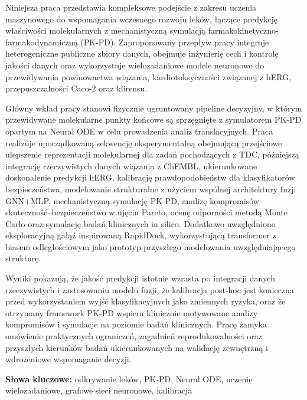 \documentclass[a4paper,11pt,twoside]{report}
\begin{document}
\begin{singlespace}
\fontsize{12pt}{14.4pt}\selectfont

Niniejsza praca przedstawia kompleksowe podejście z zakresu uczenia maszynowego do wspomagania wczesnego rozwoju leków, łączące predykcję właściwości molekularnych z mechanistyczną symulacją farmakokinetyczno-farmakodynamiczną (PK-PD). Zaproponowany przepływ pracy integruje heterogeniczne publiczne zbiory danych, obejmuje inżynierię cech i kontrolę jakości danych oraz wykorzystuje wielozadaniowe modele neuronowe do przewidywania powinowactwa wiązania, kardiotoksyczności związanej z hERG, przepuszczalności Caco-2 oraz klirensu.

Główny wkład pracy stanowi fizycznie ugruntowany pipeline decyzyjny, w którym przewidywane molekularne punkty końcowe są sprzęgnięte z symulatorem PK-PD opartym na Neural ODE w celu prowadzenia analiz translacyjnych. Praca realizuje uporządkowaną sekwencję eksperymentalną obejmującą przejściowe ulepszenie reprezentacji molekularnej dla zadań pochodzących z TDC, późniejszą integrację rzeczywistych danych wiązania z ChEMBL, ukierunkowane doskonalenie predykcji hERG, kalibrację prawdopodobieństw dla klasyfikatorów bezpieczeństwa, modelowanie strukturalne z użyciem wspólnej architektury fuzji GNN+MLP, mechanistyczną symulację PK-PD, analizę kompromisów skuteczność--bezpieczeństwo w ujęciu Pareto, ocenę odporności metodą Monte Carlo oraz symulację badań klinicznych in silico. Dodatkowo uwzględniono eksploracyjną gałąź inspirowaną RapidDock, wykorzystującą transformer z biasem odległościowym jako prototyp przyszłego modelowania uwzględniającego strukturę.

Wyniki pokazują, że jakość predykcji istotnie wzrasta po integracji danych rzeczywistych i zastosowaniu modelu fuzji, że kalibracja post-hoc jest konieczna przed wykorzystaniem wyjść klasyfikacyjnych jako zmiennych ryzyka, oraz że otrzymany framework PK-PD wspiera klinicznie motywowane analizy kompromisów i symulacje na poziomie badań klinicznych. Pracę zamyka omówienie praktycznych ograniczeń, zagadnień reprodukowalności oraz przyszłych kierunków badań ukierunkowanych na walidację zewnętrzną i wdrożeniowe wspomaganie decyzji.

\noindent\textbf{Słowa kluczowe:} odkrywanie leków, PK-PD, Neural ODE, uczenie wielozadaniowe, grafowe sieci neuronowe, kalibracja

\end{singlespace}

\thispagestyle{empty}
\clearpage
\end{document}
